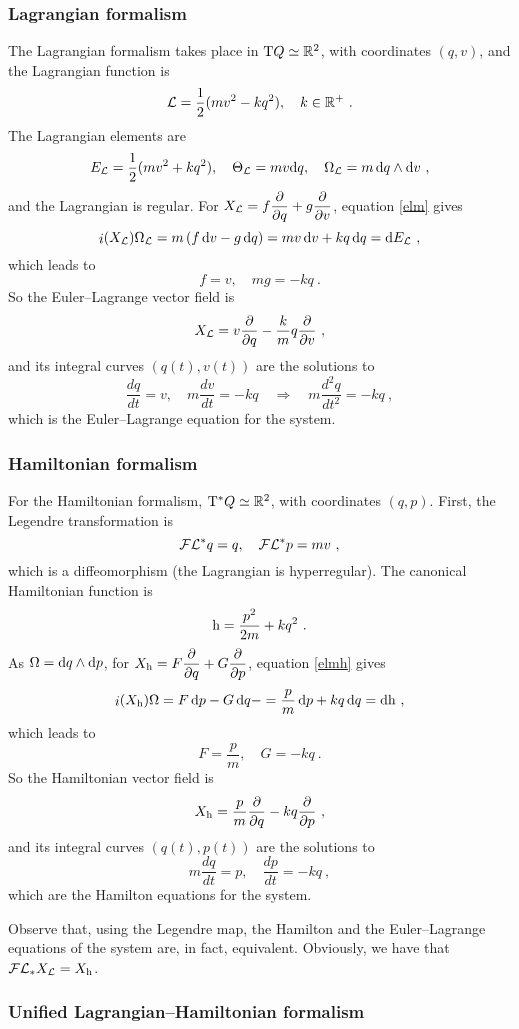 \documentclass[12pt]{report}
\def\derpar#1#2{\frac{\partial{#1}}{\partial{#2}}}
\def\Lag{{\cal L}}
\def\d{{\rm d}}
\def\Real{\mathbb{R}}
\def\Tan{{\rm T}}
\def\inn{\mathop{i}\nolimits}
\def\Leg{{\cal F}\Lag}
\begin{document}
\subsubsection{Lagrangian formalism}


The Lagrangian formalism takes place in $\Tan Q\simeq\Real^2$, with coordinates 
$(q,v)$, and the Lagrangian function is 
$$
\Lag=\frac{1}{2}(mv^2-kq^2) ,\quad k\in\Real^+ \ .
$$
The Lagrangian elements are
$$
E_\Lag=\frac{1}{2}(mv^2+kq^2) ,\quad
\Theta_\Lag=mv\d q ,\quad
\Omega_\Lag = m\,\d q\wedge\d v \ ,
$$
and the Lagrangian is regular.
For $\displaystyle X_\Lag=f\derpar{}{q}+g\derpar{}{v}$, equation \eqref{elm} gives
$$
\inn(X_\Lag)\Omega_\Lag=
m\,(f\, \d v-g\, \d q)=
mv\, \d v+kq\, \d q=\d E_\Lag\ ,
$$
which leads to
$$
f=v ,\quad mg=-kq \ .
$$
So the Euler--Lagrange vector field is
$$
X_\Lag=v\derpar{}{q}-\frac{k}{m}q\derpar{}{v} \ ,
$$
and its integral curves $(q(t),v(t))$ are the solutions to
$$
\frac{dq}{dt} =v ,\quad m\frac{dv}{dt}=-kq
\quad \Longrightarrow \quad m\frac{d^2q}{dt^2}=-kq  \ ,
$$
which is the Euler--Lagrange equation for the system.

\subsubsection{Hamiltonian formalism}

For the Hamiltonian formalism, $\Tan^*Q\simeq\Real^2$,
with coordinates $(q,p)$. First, the Legendre transformation is
$$
\Leg^*q=q  ,\quad \Leg^*p=mv  \ ,
$$
which is a diffeomorphism (the Lagrangian is hyperregular).
The canonical Hamiltonian function is
$$
{\rm h}=\frac{p^2}{2m}+kq^2 \ .
$$
As $\Omega=\d q\wedge\d p$,
for $\displaystyle X_{\rm h}=F\derpar{}{q}+G\derpar{}{p}$,
equation \eqref{elmh} gives
$$
\inn(X_{\rm h})\Omega= F\, \d p-G\, \d q-=
\frac{p}{m}\, \d p+kq\, \d q=\d{\rm h}\ ,
$$
which leads to
$$
F=\frac{p}{m} ,\quad G=-kq  \ .
$$
So the Hamiltonian vector field is
$$
X_{\rm h}=\frac{p}{m}\derpar{}{q}-kq\derpar{}{p} \ ,
$$
and its integral curves $(q(t),p(t))$ are the solutions to
$$
m\frac{dq}{dt} =p ,\quad
\frac{dp}{dt}=-kq \ ,
$$
which are the Hamilton equations for the system.

Observe that, using the Legendre map, the Hamilton and
the Euler--Lagrange equations of the system are, in fact, equivalent.
Obviously, we have that $\Leg_*X_\Lag=X_{\rm h}$.


\subsubsection{Unified Lagrangian--Hamiltonian formalism}
\end{document}
